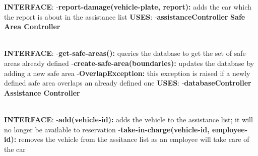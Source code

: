 \documentclass{article}
\begin{document}
\textbf{INTERFACE}: 
 \newline
-\textbf{report-damage(vehicle-plate, report):} adds the car which the report is about in the assistance list   
\newline
\textbf{USES}:   
\newline
-\textbf{assistanceController}
\newpage
\textbf{Safe Area Controller}\\
\begin{figure}[ht]
\end{figure}\\
\textbf{INTERFACE}: 
 \newline
-\textbf{get-safe-areas():} queries the database to get the set of safe areas already defined   
\newline
-\textbf{create-safe-area(boundaries):} updates the database by adding a new safe area
\newline
-\textbf{OverlapException:} this exception is raised if a newly defined safe area overlaps an already defined one
\newline
\textbf{USES}:   
\newline
-\textbf{databaseController}
\newpage
\textbf{Assistance Controller}\\
\begin{figure}[ht]
\end{figure}\\
\textbf{INTERFACE}: 
 \newline
-\textbf{add(vehicle-id):} adds the vehicle to the assistance list; it will no longer be available to reservation  
\newline
-\textbf{take-in-charge(vehicle-id, employee-id):} removes the vehicle from the assitance list as an employee will take care of the car
\newline
\end{document}
